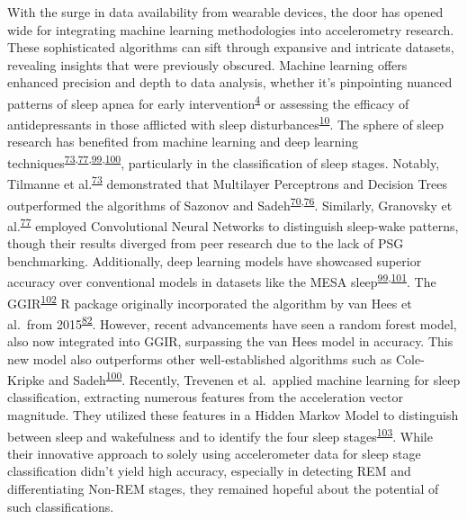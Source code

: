 \documentclass[
  10pt,
]{scrbook}
\begin{document}
With the surge in data availability from wearable devices, the door has
opened wide for integrating machine learning methodologies into
accelerometry research. These sophisticated algorithms can sift through
expansive and intricate datasets, revealing insights that were
previously obscured. Machine learning offers enhanced precision and
depth to data analysis, whether it's pinpointing nuanced patterns of
sleep apnea for early
intervention\textsuperscript{\protect\hyperlink{ref-cappuccio_sleep_2010}{4}}
or assessing the efficacy of antidepressants in those afflicted with
sleep
disturbances\textsuperscript{\protect\hyperlink{ref-paruthi_consensus_2016}{10}}.
The sphere of sleep research has benefited from machine learning and
deep learning
techniques\textsuperscript{\protect\hyperlink{ref-tilmanne_2009}{73},\protect\hyperlink{ref-granovsky_actigraphy-based_2018}{77},\protect\hyperlink{ref-palotti_benchmark_2019}{99},\protect\hyperlink{ref-sundararajan_sleep_2021}{100}},
particularly in the classification of sleep stages. Notably, Tilmanne et
al.\textsuperscript{\protect\hyperlink{ref-tilmanne_2009}{73}}
demonstrated that Multilayer Perceptrons and Decision Trees outperformed
the algorithms of Sazonov and
Sadeh\textsuperscript{\protect\hyperlink{ref-sadeh_activity-based_1994}{70},\protect\hyperlink{ref-sazonov_activity-based_2004}{76}}.
Similarly, Granovsky et
al.\textsuperscript{\protect\hyperlink{ref-granovsky_actigraphy-based_2018}{77}}
employed Convolutional Neural Networks to distinguish sleep-wake
patterns, though their results diverged from peer research due to the
lack of PSG benchmarking. Additionally, deep learning models have
showcased superior accuracy over conventional models in datasets like
the MESA
sleep\textsuperscript{\protect\hyperlink{ref-palotti_benchmark_2019}{99},\protect\hyperlink{ref-lutsey_objectively_2015}{101}}.
The
GGIR\textsuperscript{\protect\hyperlink{ref-migueles_ggir_2019}{102}} R
package originally incorporated the algorithm by van Hees et al.~from
2015\textsuperscript{\protect\hyperlink{ref-hees_novel_2015}{82}}.
However, recent advancements have seen a random forest model, also now
integrated into GGIR, surpassing the van Hees model in accuracy. This
new model also outperforms other well-established algorithms such as
Cole-Kripke and
Sadeh\textsuperscript{\protect\hyperlink{ref-sundararajan_sleep_2021}{100}}.
Recently, Trevenen et al.~applied machine learning for sleep
classification, extracting numerous features from the acceleration
vector magnitude. They utilized these features in a Hidden Markov Model
to distinguish between sleep and wakefulness and to identify the four
sleep
stages\textsuperscript{\protect\hyperlink{ref-trevenen_2019}{103}}.
While their innovative approach to solely using accelerometer data for
sleep stage classification didn't yield high accuracy, especially in
detecting REM and differentiating Non-REM stages, they remained hopeful
about the potential of such classifications.
\end{document}
